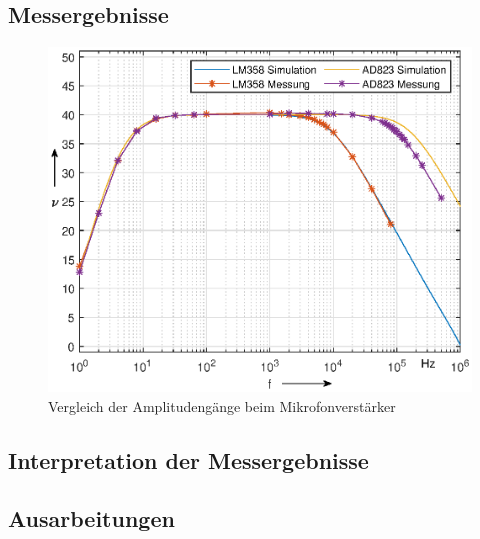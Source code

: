 \subsection{Messergebnisse}
\begin{figure}
    \centering
    \includegraphics[width=\textwidth]{Lab_3/Plots/Mikrofonverstaerker.eps}
    \caption{Vergleich der Amplitudengänge beim Mikrofonverstärker}
    \label{fig:my_label}
\end{figure}
\subsection{Interpretation der Messergebnisse} 

\subsection{Ausarbeitungen}